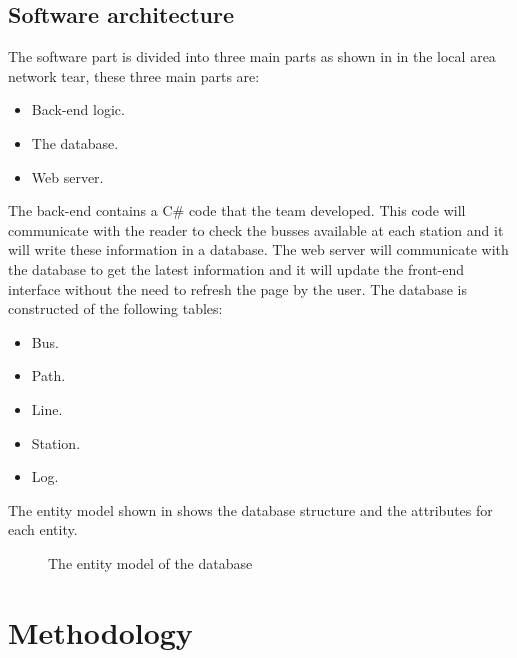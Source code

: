 \documentclass[a4paper,twoside]{article}
\begin{document}
\subsection{Software architecture}
The software part is divided into three main parts as shown in  in the local area network tear, these three main parts are:
\begin{itemize}
\item
Back-end logic.
\item
The database.
\item
Web server.
\end{itemize}
The back-end contains a C\# code that the team developed. This code will communicate with the reader to check the busses available at each station and it will write these information in a database. The web server will communicate with the database to get the latest information and it will update the front-end interface without the need to refresh the page by the user. The database is constructed of the following tables:
\begin{itemize}
\item
Bus.
\item
Path.
\item
Line.
\item
Station.
\item
Log.
\end{itemize}
The entity model shown in  shows the database structure and the attributes for each entity.
\begin{figure}
\centering
{}
\caption{The entity model of the database}
\label{entity}
\end{figure}


\section{Methodology}
\end{document}
